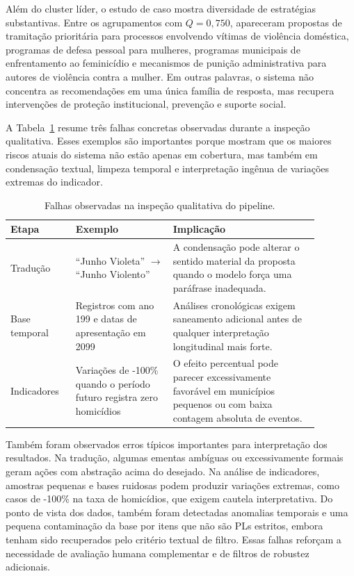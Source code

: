 Além do cluster líder, o estudo de caso mostra diversidade de estratégias substantivas. Entre os agrupamentos com $Q=0,750$, apareceram propostas de tramitação prioritária para processos envolvendo vítimas de violência doméstica, programas de defesa pessoal para mulheres, programas municipais de enfrentamento ao feminicídio e mecanismos de punição administrativa para autores de violência contra a mulher. Em outras palavras, o sistema não concentra as recomendações em uma única família de resposta, mas recupera intervenções de proteção institucional, prevenção e suporte social.

A Tabela~\ref{tab:falhas-v2} resume três falhas concretas observadas durante a inspeção qualitativa. Esses exemplos são importantes porque mostram que os maiores riscos atuais do sistema não estão apenas em cobertura, mas também em condensação textual, limpeza temporal e interpretação ingênua de variações extremas do indicador.

\begin{table}[H]
\centering
\caption{Falhas observadas na inspeção qualitativa do pipeline.}
\label{tab:falhas-v2}
\small
\begin{tabular}{p{0.18\linewidth} p{0.28\linewidth} p{0.42\linewidth}}
\toprule
Etapa & Exemplo & Implicação \\
\midrule
Tradução & ``Junho Violeta'' $\rightarrow$ ``Junho Violento'' & A condensação pode alterar o sentido material da proposta quando o modelo força uma paráfrase inadequada. \\
Base temporal & Registros com ano 199 e datas de apresentação em 2099 & Análises cronológicas exigem saneamento adicional antes de qualquer interpretação longitudinal mais forte. \\
Indicadores & Variações de -100\% quando o período futuro registra zero homicídios & O efeito percentual pode parecer excessivamente favorável em municípios pequenos ou com baixa contagem absoluta de eventos. \\
\bottomrule
\end{tabular}
\end{table}

Também foram observados erros típicos importantes para interpretação dos resultados. Na tradução, algumas ementas ambíguas ou excessivamente formais geram ações com abstração acima do desejado. Na análise de indicadores, amostras pequenas e bases ruidosas podem produzir variações extremas, como casos de -100\% na taxa de homicídios, que exigem cautela interpretativa. Do ponto de vista dos dados, também foram detectadas anomalias temporais e uma pequena contaminação da base por itens que não são PLs estritos, embora tenham sido recuperados pelo critério textual de filtro. Essas falhas reforçam a necessidade de avaliação humana complementar e de filtros de robustez adicionais.
